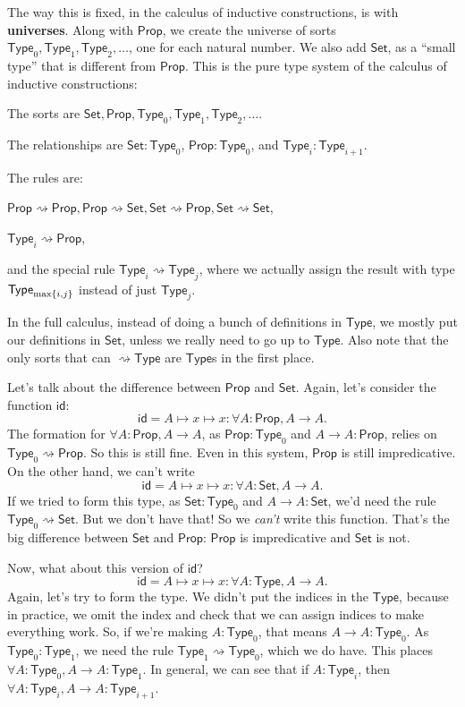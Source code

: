 \documentclass[11pt,paper=letter]{scrartcl}
\newcommand{\sf}{\mathsf}
\newcommand{\set}{\mathsf{Set}}
\newcommand{\prop}{\mathsf{Prop}}
\newcommand{\type}{\mathsf{Type}}
\newcommand{\toto}{\rightsquigarrow}
\begin{document}
The way this is fixed, in the calculus of inductive constructions, is with \textbf{universes}. Along with $\prop$, we create the universe of sorts $\type_0, \type_1, \type_2, \ldots$, one for each natural number. We also add $\set$, as a ``small type'' that is different from $\prop$. This is the pure type system of the calculus of inductive constructions:

\begin{itemthin}
\item The sorts are $\set, \prop, \type_0, \type_1, \type_2, \ldots$.

\item The relationships are $\set : \type_0$, $\prop : \type_0$, and $\type_i : \type_{i+1}$.

\item The rules are:
\vspace{-0.5em}
\begin{itemthin}
\item $\prop \toto \prop, \prop \toto \set, \set \toto \prop, \set \toto \set$,
\item $\type_i \toto \prop$,
\item and the special rule $\type_i \toto \type_j$, where we actually assign the result with type $\type_{\max\cbr{i, j}}$ instead of just $\type_j$.
\end{itemthin}
\end{itemthin}

In the full calculus, instead of doing a bunch of definitions in $\type$, we mostly put our definitions in $\set$, unless we really need to go up to $\type$. Also note that the only sorts that can $\toto \type$ are $\type$s in the first place.

Let's talk about the difference between $\prop$ and $\set$. Again, let's consider the function $\sf{id}$:
\[
  \sf{id} = A \mapsto x \mapsto x : \forall A: \prop, A \to A.
\]
The formation for $\forall A: \prop, A \to A$, as $\prop : \type_0$ and $A \to A : \prop$, relies on $\type_0 \toto \prop$. So this is still fine. Even in this system, $\prop$ is still impredicative. On the other hand, we can't write \[
  \sf{id} = A \mapsto x \mapsto x : \forall A: \set, A \to A.
\]
If we tried to form this type, as $\set : \type_0$ and $A \to A : \set$, we'd need the rule $\type_0 \toto \set$. But we don't have that! So we \emph{can't} write this function. That's the big difference between $\set$ and $\prop$: $\prop$ is impredicative and $\set$ is not.

Now, what about this version of $\sf{id}$? \[
  \sf{id} = A \mapsto x \mapsto x : \forall A: \type, A \to A.
\]
Again, let's try to form the type. We didn't put the indices in the $\type$, because in practice, we omit the index and check that we can assign indices to make everything work. So, if we're making $A: \type_0$, that means $A \to A: \type_0$. As $\type_0 : \type_1$, we need the rule $\type_1 \toto \type_0$, which we do have. This places $\forall A: \type_0, A \to A : \type_1$. In general, we can see that if $A: \type_i$, then $\forall A: \type_i, A \to A : \type_{i+1}$.
\end{document}
